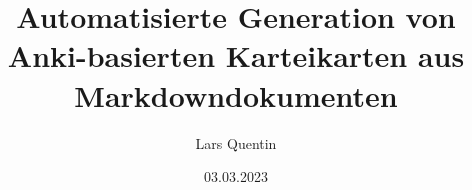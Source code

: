 \title{Automatisierte Generation von Anki-basierten Karteikarten aus Markdowndokumenten}
\author{Lars Quentin}
\date{03.03.2023}
